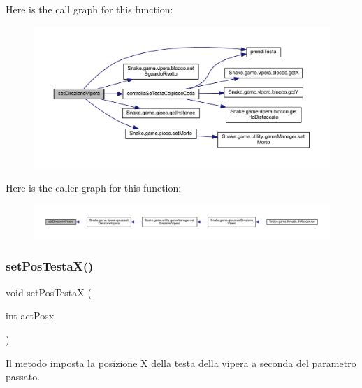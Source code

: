 Here is the call graph for this function\+:
\nopagebreak
\begin{figure}[H]
\begin{center}
\leavevmode
\includegraphics[width=350pt]{class_snake_1_1game_1_1vipera_1_1blocchi_a6007259ace9d33bd56b9a6193e86df39_cgraph}
\end{center}
\end{figure}
Here is the caller graph for this function\+:
\nopagebreak
\begin{figure}[H]
\begin{center}
\leavevmode
\includegraphics[width=350pt]{class_snake_1_1game_1_1vipera_1_1blocchi_a6007259ace9d33bd56b9a6193e86df39_icgraph}
\end{center}
\end{figure}
\mbox{\label{class_snake_1_1game_1_1vipera_1_1blocchi_a1e26556cba7802de510ce21bc9096149}} 
\subsubsection{\texorpdfstring{set\+Pos\+Testa\+X()}{setPosTestaX()}}
{\footnotesize\ttfamily void set\+Pos\+TestaX (\begin{DoxyParamCaption}\item[{int}]{act\+Posx }\end{DoxyParamCaption})}



Il metodo imposta la posizione X della testa della vipera a seconda del parametro passato. 


